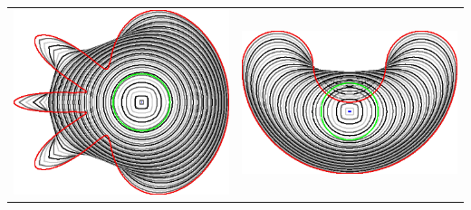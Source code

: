 \begin{frame}
\begin{center}
\begin{tabular}{cc}
\includegraphics[scale=0.12]{figures/curve-shortening-flow/no-neighborhood-flow-always-evolve/0.015625/flower.png}\hspace{3em} &
\includegraphics[scale=0.12]{figures/curve-shortening-flow/no-neighborhood-flow-always-evolve/0.015625/bean.png}
\end{tabular}
\end{center}

\end{frame}